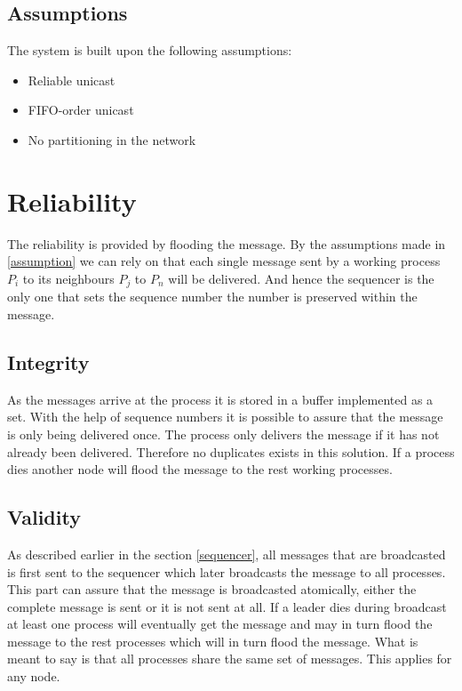 \documentclass{article}
\begin{document}
  \subsection{Assumptions}
  The system is built upon the following assumptions:
  \label{assumption}
  \begin{itemize}
  \item Reliable unicast
  \item FIFO-order unicast
  \item No partitioning in the network
  \end{itemize}  

\section{Reliability} 
  \label{reliability}
  The reliability is provided by flooding the message. By the assumptions made in \ref{assumption} we can rely on 
  that each single message sent by a working process $P_i$ to its neighbours $P_j$ to $P_n$ will be delivered.
  And hence the sequencer is the only one that sets the sequence number the number is preserved within the message.
  
\subsection{Integrity}
As the messages arrive at the process it is stored in a buffer implemented as a set. With the help of sequence numbers
it is possible to assure that the message is only being delivered once. The process only delivers the message if it
has not already been delivered. Therefore no duplicates exists in this solution. If a process dies another node will flood
the message to the rest working processes.


\subsection{Validity}
As described earlier in the section \ref{sequencer}, all messages that are broadcasted is first sent to the sequencer which
later broadcasts the message to all processes. This part can assure that the message is broadcasted atomically, either the complete
message is sent or it is not sent at all. If a leader dies during broadcast at least one process will eventually get the message and 
may in turn flood the message to the rest processes which will in turn flood the message. What is meant to say is that all processes
share the same set of messages. This applies for any node.
\end{document}
